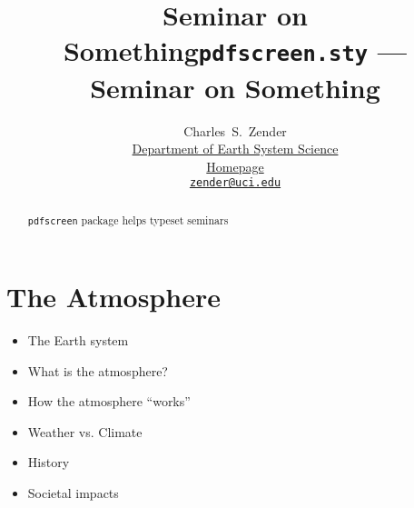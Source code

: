 \documentclass[12pt]{article}
\newcommand{\pdfscreen}{\texttt{\small\color{section1}pdfscreen}\xspace} %
\begin{document}

\begin{screen}
\title{\color{section0}\Huge Seminar on Something}
\end{screen}

\begin{print}
\title{\Huge\texttt{pdfscreen.sty} --- Seminar on Something}
\end{print}

\author{
\color{section1}\Large Charles~S.~Zender\\
\href{http://www.ess.uci.edu/~zender}{Department of Earth System Science}\\
\href{http://www.ess.uci.edu/~zender}{Homepage}\\
{\small\href{mailto:zender@uci.edu}{\color{section1}\texttt{zender@uci.edu}}}
} %


\date{} %
\maketitle
\begin{screen}
\vfill
\end{screen}

\begin{abstract}
\noindent \pdfscreen package helps typeset seminars
\end{abstract}

\begin{print}
\tableofcontents
\end{print}
\begin{screen}
\vfill
\end{screen}

\section[The Atmosphere]{The Atmosphere}
\begin{itemize}
\item The Earth system %
\item What is the atmosphere? %
\item How the atmosphere ``works'' %
\item Weather vs. Climate %
\item History %
\item Societal impacts %
\end{itemize}
\vfill
\end{document}
